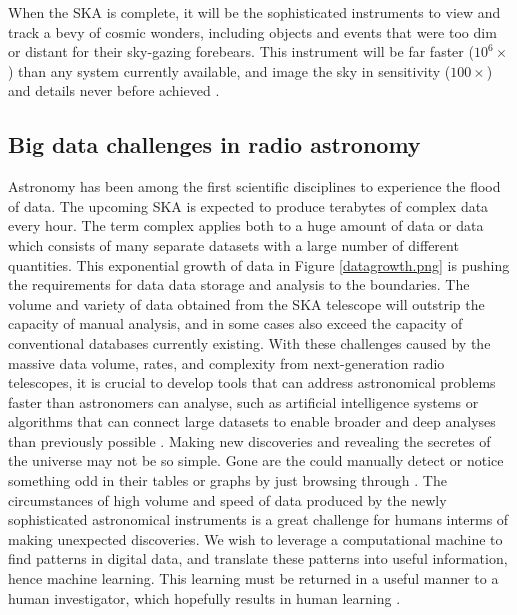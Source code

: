 When the SKA is complete, it will be the sophisticated instruments to view and track a bevy of cosmic wonders, including objects and events that were too dim or distant for their sky-gazing forebears. This instrument will be far faster ($10^6\times$) than any system currently available, and image the sky in sensitivity ($100\times$) and details never before achieved \citep{skatelescope}.

\subsection{Big data challenges in radio astronomy}

Astronomy has been among the first scientific disciplines to experience the flood of data. The upcoming SKA is expected to produce terabytes of complex data every hour. The term complex applies both to a huge amount of data or data which consists of many separate datasets with a large number of different quantities. This exponential growth of data in Figure \ref{datagrowth.png} is pushing the requirements for data data storage and analysis to the boundaries. The volume and variety of data obtained from the SKA telescope will outstrip the capacity of manual analysis, and in some cases also exceed the capacity of conventional databases currently existing. With these challenges caused by the massive data volume, rates, and complexity from next-generation radio telescopes, it is crucial to develop tools that can address astronomical problems faster than astronomers can analyse, such as artificial intelligence systems or algorithms that can connect large datasets to enable broader and deep analyses than previously possible \citep{provost2013data}. Making new discoveries and revealing the secretes of the universe may not be so simple. Gone are the could manually detect or notice something odd in their tables or graphs by just browsing through \citep{RayNorris}. The circumstances of high volume and speed of data produced by the newly sophisticated astronomical instruments is a great challenge for humans interms of making unexpected discoveries. We wish to leverage a computational machine to
find patterns in digital data, and translate these patterns into useful information, hence machine learning. This learning must be returned in a useful manner to a human investigator, which hopefully results in human learning \citep{ball2010data}.